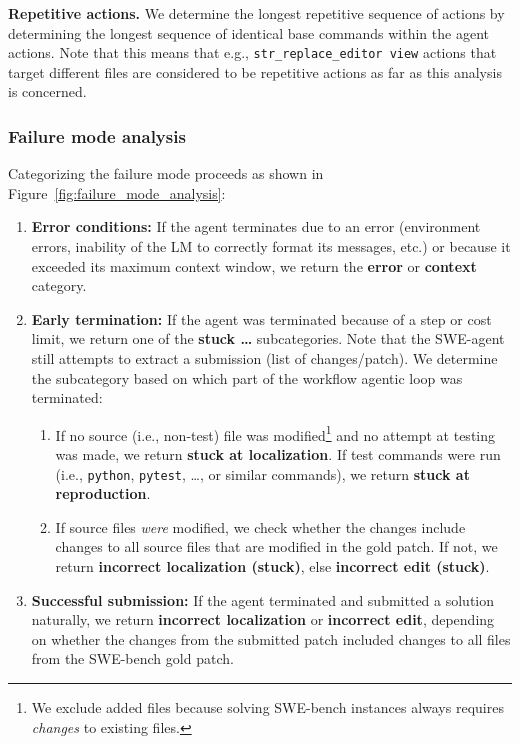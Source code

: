 \textbf{Repetitive actions.} 
We determine the longest repetitive sequence of actions by determining the longest sequence of identical base commands within the agent actions.
Note that this means that e.g., \texttt{str\_replace\_editor view} actions that target different files are considered to be repetitive actions as far as this analysis is concerned. 

\subsubsection{Failure mode analysis}

Categorizing the failure mode proceeds as shown in Figure~\ref{fig:failure_mode_analysis}:
\begin{enumerate}
\item \textbf{Error conditions:} If the agent terminates due to an error (environment errors, inability of the LM to correctly format its messages, etc.) or because it exceeded its maximum context window, we return the \textbf{error} or \textbf{context} category.
\item \textbf{Early termination:} If the agent was terminated because of a step or cost limit, we return one of the \textbf{stuck …} subcategories. Note that the SWE-agent still attempts to extract a submission (list of changes/patch).
We determine the subcategory based on which part of the workflow agentic loop was terminated:
\begin{enumerate}
\item If no source (i.e., non-test) file was modified\footnote{We exclude added files because solving SWE-bench instances always requires \emph{changes} to existing files.} and no attempt at testing was made, we return \textbf{stuck at localization}. If test commands were run (i.e., \texttt{python}, \texttt{pytest}, \dots, or similar commands), we return \textbf{stuck at reproduction}.
%
\item If source files \emph{were} modified, we check whether the changes include changes to all source files that are modified in the gold patch. If not, we return \textbf{incorrect localization (stuck)}, else \textbf{incorrect edit (stuck)}.
\end{enumerate}
\item \textbf{Successful submission:} If the agent terminated and submitted a solution naturally, we return \textbf{incorrect localization} or \textbf{incorrect edit}, depending on whether the changes from the submitted patch included changes to all files from the SWE-bench gold patch.
\end{enumerate}


